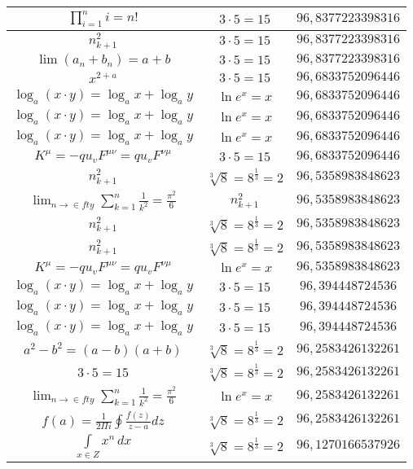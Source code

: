 \documentclass{article}
\begin{document}
\begin{flushleft}
\begin{longtable}{|c|c|c|}
$\prod_{i=1}^ni=n!$ & $3\cdot 5=15$ & $96,8377223398316$ \\ \hline 
$n_{k+1}^2$ & $3\cdot 5=15$ & $96,8377223398316$ \\ \hline 
$\lim\left(a_n+b_n\right)=a+b$ & $3\cdot 5=15$ & $96,8377223398316$ \\ \hline 
$x^{2+a}$ & $3\cdot 5=15$ & $96,6833752096446$ \\ \hline 
$\log_{a}(x\cdot y)=\log_{a}x+\log_{a}y$ & $\ln e^x=x$ & $96,6833752096446$ \\ \hline 
$\log_{a}(x\cdot y)=\log_{a}x+\log_{a}y$ & $\ln e^x=x$ & $96,6833752096446$ \\ \hline 
$\log_{a}(x\cdot y)=\log_{a}x+\log_{a}y$ & $\ln e^x=x$ & $96,6833752096446$ \\ \hline 
$K^\mu=-qu_vF^{\mu\nu}=qu_vF^{\nu\mu}$ & $3\cdot 5=15$ & $96,6833752096446$ \\ \hline 
$n_{k+1}^2$ & $\sqrt[3]{8}=8^{\frac{1}{3}}=2$ & $96,5358983848623$ \\ \hline 
$\lim_{n\to\in fty}\sum_{k=1}^n\frac{1}{k^2}=\frac{\pi^2}{6}$ & $n_{k+1}^2$ & $96,5358983848623$ \\ \hline 
$n_{k+1}^2$ & $\sqrt[3]{8}=8^{\frac{1}{3}}=2$ & $96,5358983848623$ \\ \hline 
$n_{k+1}^2$ & $\sqrt[3]{8}=8^{\frac{1}{3}}=2$ & $96,5358983848623$ \\ \hline 
$K^\mu=-qu_vF^{\mu\nu}=qu_vF^{\nu\mu}$ & $\ln e^x=x$ & $96,5358983848623$ \\ \hline 
$\log_{a}(x\cdot y)=\log_{a}x+\log_{a}y$ & $3\cdot 5=15$ & $96,394448724536$ \\ \hline 
$\log_{a}(x\cdot y)=\log_{a}x+\log_{a}y$ & $3\cdot 5=15$ & $96,394448724536$ \\ \hline 
$\log_{a}(x\cdot y)=\log_{a}x+\log_{a}y$ & $3\cdot 5=15$ & $96,394448724536$ \\ \hline 
$a^2-b^2=(a-b)(a+b)$ & $\sqrt[3]{8}=8^{\frac{1}{3}}=2$ & $96,2583426132261$ \\ \hline 
$3\cdot 5=15$ & $\sqrt[3]{8}=8^{\frac{1}{3}}=2$ & $96,2583426132261$ \\ \hline 
$\lim_{n\to\in fty}\sum_{k=1}^n\frac{1}{k^2}=\frac{\pi^2}{6}$ & $\ln e^x=x$ & $96,2583426132261$ \\ \hline 
$f\left(a\right)=\frac{1}{2\Pi i}\oint\frac{f\left(z\right)}{z-a}dz$ & $\sqrt[3]{8}=8^{\frac{1}{3}}=2$ & $96,2583426132261$ \\ \hline 
$\int \limits_{x\in Z}\!x^{n}\,dx$ & $\sqrt[3]{8}=8^{\frac{1}{3}}=2$ & $96,1270166537926$ \\ \hline 

\end{longtable}
\end{flushleft}
\end{document}
